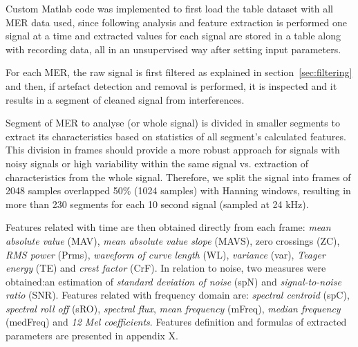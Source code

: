 Custom Matlab code was implemented to first load the table dataset with all MER data used, since following analysis and feature extraction is performed one signal at a time and extracted values for each signal are stored in a table along with recording data, all in an unsupervised way after setting input parameters. 

For each MER, the raw signal is first filtered as explained in section~\ref{sec:filtering} and then, if artefact detection and removal is performed, it is inspected and it results in a segment of cleaned signal from interferences. 

Segment of MER to analyse (or whole signal) is divided in smaller segments to extract its characteristics based on statistics of all segment's calculated features. This division in frames should provide a more robust approach for signals with noisy signals or high variability within the same signal vs. extraction of characteristics from the whole signal. Therefore, we split the signal into frames of 2048 samples overlapped 50\% (1024 samples) with Hanning windows, resulting in more than 230 segments for each 10 second signal (sampled at 24 kHz). 

Features related with time are then obtained directly from each frame: \textit{mean absolute value} (MAV), \textit{mean absolute value slope} (MAVS), zero crossings (ZC), \textit{RMS power} (Prms), \textit{waveform of curve length} (WL), \textit{variance} (var), \textit{Teager energy} (TE) and \textit{crest factor} (CrF). In relation to noise, two measures were obtained:an estimation of \textit{standard deviation of noise} (spN) and \textit{signal-to-noise ratio} (SNR). Features related with frequency domain are: \textit{spectral centroid} (spC), \textit{spectral roll off} (sRO), \textit{spectral flux}, \textit{mean frequency} (mFreq), \textit{median frequency} (medFreq) and \textit{12 Mel coefficients}. Features definition and formulas of extracted parameters are presented in appendix X.


